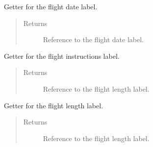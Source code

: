\documentclass[letterpaper,10pt,english]{sphinxmanual}
\begin{document}
\begin{fulllineitems}
\begin{fulllineitems}
\begin{quote}
\begin{description}
\end{description}\end{quote}

\end{fulllineitems}


\begin{fulllineitems}
\label{\detokenize{index:src.Views.View_ReportScreen.ReportWindow.set_LblFlightDate}}
Getter for the flight date label.
\begin{quote}\begin{description}
\item[{Returns}] \leavevmode
Reference to the flight date label.

\end{description}\end{quote}

\end{fulllineitems}


\begin{fulllineitems}
\label{\detokenize{index:src.Views.View_ReportScreen.ReportWindow.set_LblFlightInstructions}}
Getter for the flight instructions label.
\begin{quote}\begin{description}
\item[{Returns}] \leavevmode
Reference to the flight length label.

\end{description}\end{quote}

\end{fulllineitems}


\begin{fulllineitems}
\label{\detokenize{index:src.Views.View_ReportScreen.ReportWindow.set_LblFlightLength}}
Getter for the flight length label.
\begin{quote}\begin{description}
\item[{Returns}] \leavevmode
Reference to the flight length label.


\end{description}
\end{quote}
\end{fulllineitems}
\end{fulllineitems}
\end{document}
